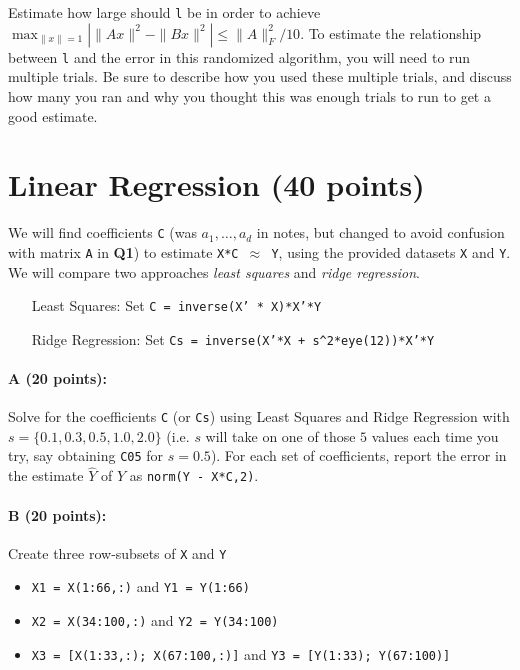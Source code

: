 \documentclass[11pt]{article}
\begin{document}
Estimate how large should \texttt{l} be in order to achieve $\max_{\|x\|=1} | \|A x\|^2 - \|B x\|^2 | \leq \|A\|_F^2/10$.  To estimate the relationship between \texttt{l} and the error in this randomized algorithm, you will need to run multiple trials.  Be sure to describe how you used these multiple trials, and discuss how many you ran and why you thought this was enough trials to run to get a good estimate.  




\section{Linear Regression (40 points)}

We will find coefficients \texttt{C} (was $a_1, \ldots, a_d$ in notes, but changed to avoid confusion with matrix \texttt{A} in {\bf{\sffamily Q1}}) to estimate \texttt{X*C $\approx$ Y}, using the provided datasets \texttt{X} and \texttt{Y}.  We will compare two approaches \emph{least squares} and \emph{ridge regression}.  

\begin{itemize} \denselist
\item[\textsf{Least Squares:} ]  Set \texttt{C = inverse(X' * X)*X'*Y}
\item[\textsf{Ridge Regression:} ] Set \texttt{Cs = inverse(X'*X + s\^{}2*eye(12))*X'*Y}
\end{itemize}

\paragraph{A (20 points): }
Solve for the coefficients \texttt{C} (or \texttt{Cs}) using Least Squares and Ridge Regression with $s = \{0.1, 0.3, 0.5, 1.0, 2.0\}$ (i.e. $s$ will take on one of those $5$ values each time you try, say obtaining \texttt{C05} for $s=0.5$).  
For each set of coefficients, report the error in the estimate $\hat{Y}$ of $Y$ as 
\texttt{norm(Y - X*C,2)}.

\paragraph{B (20 points): }
Create three row-subsets of \texttt{X} and \texttt{Y}
\begin{itemize} \denselist
\item \texttt{X1 = X(1:66,:)} and \texttt{Y1 = Y(1:66)}
\item \texttt{X2 = X(34:100,:)} and \texttt{Y2 = Y(34:100)}
\item \texttt{X3 = [X(1:33,:); X(67:100,:)]} and \texttt{Y3 = [Y(1:33); Y(67:100)]}
\end{itemize}
\end{document}
